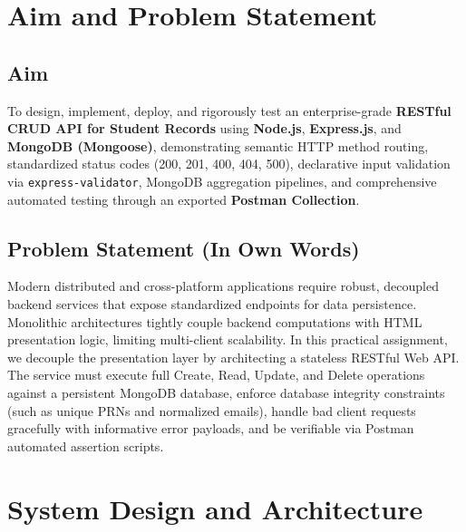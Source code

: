 \documentclass[11pt,a4paper]{article}
\begin{document}
\section{Aim and Problem Statement}

\subsection{Aim}
To design, implement, deploy, and rigorously test an enterprise-grade \textbf{RESTful CRUD API for Student Records} using \textbf{Node.js}, \textbf{Express.js}, and \textbf{MongoDB (Mongoose)}, demonstrating semantic HTTP method routing, standardized status codes (200, 201, 400, 404, 500), declarative input validation via \texttt{express-validator}, MongoDB aggregation pipelines, and comprehensive automated testing through an exported \textbf{Postman Collection}.

\subsection{Problem Statement (In Own Words)}
Modern distributed and cross-platform applications require robust, decoupled backend services that expose standardized endpoints for data persistence. Monolithic architectures tightly couple backend computations with HTML presentation logic, limiting multi-client scalability. In this practical assignment, we decouple the presentation layer by architecting a stateless RESTful Web API. The service must execute full Create, Read, Update, and Delete operations against a persistent MongoDB database, enforce database integrity constraints (such as unique PRNs and normalized emails), handle bad client requests gracefully with informative error payloads, and be verifiable via Postman automated assertion scripts.

\section{System Design and Architecture}
\end{document}
